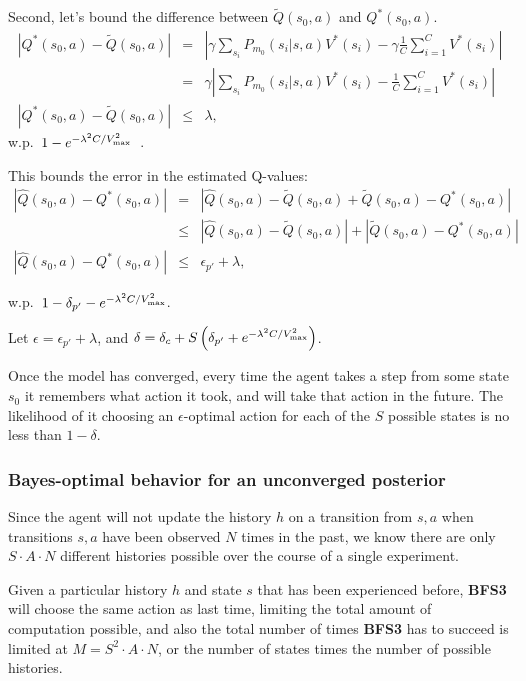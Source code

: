 Second, let's bound the difference between $\tilde Q(s_0, a)$ and $Q^*(s_0, a)$.
\begin{eqnarray}
\nonumber |Q^*(s_0, a) - \tilde Q(s_0, a)| &=& \left|\gamma \sum_{s_i} P_{m_0}(s_i|s,a)V^*(s_i) - \gamma \frac 1 C \sum_{i=1}^C V^*(s_i)\right|\\
\nonumber &=& \gamma \left|\sum_{s_i} P_{m_0}(s_i|s,a)V^*(s_i) - \frac 1 C \sum_{i=1}^C V^*(s_i)\right|\\
|Q^*(s_0, a) - \tilde Q(s_0, a)| &\leq& \lambda,
\end{eqnarray}
w.p.\ $1-e^{-\lambda^2 C / {V_{\rm max}^2}}$~\cite{kearns99b}.

This bounds the error in the estimated Q-values:
\begin{eqnarray}
\nonumber |\hat Q(s_0, a) - Q^*(s_0, a)| &=& |\hat Q(s_0, a) - \tilde Q(s_0, a) + \tilde Q(s_0, a) - Q^*(s_0, a)|\\
\nonumber &\leq& |\hat Q(s_0, a) - \tilde Q(s_0, a)| + |\tilde Q(s_0, a) - Q^*(s_0, a)|\\
|\hat Q(s_0, a) - Q^*(s_0, a)| &\leq& \epsilon_{p'}+\lambda,
\end{eqnarray}

w.p.\ $1 - \delta_{p'} - e^{-\lambda^2 C / {V_{\rm max}^2}}$.

Let $\epsilon = \epsilon_{p'}+\lambda$, and $\delta = \delta_c + S\left(\delta_{p'} + e^{-\lambda^2 C / {V_{\rm max}^2}}\right)$.

Once the model has converged, every time the agent takes a step from some state $s_0$ it remembers what action it took, and will take that action in the future. The likelihood of it choosing an $\epsilon$-optimal action for each of the $S$ possible states is no less than $1-\delta$.

\subsubsection{Bayes-optimal behavior for an unconverged posterior}

Since the agent will not update the history $h$ on a transition from $s,a$ when transitions $s,a$ have been observed $N$ times in the past, we know there are only $S \cdot A \cdot N$ different histories possible over the course of a single experiment.

Given a particular history $h$ and state $s$ that has been experienced before, {\bf BFS3} will choose the same action as last time, limiting the total amount of computation possible, and also the total number of times {\bf BFS3} has to succeed is limited at $M = S^2 \cdot A \cdot N$, or the number of states times the number of possible histories.

